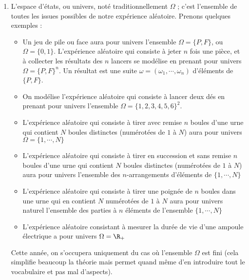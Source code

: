 \documentclass[12pt,a4paper]{report}
\begin{document}
\begin{enumerate}
	\item L'espace d'états, ou univers, noté traditionnellement $\Omega$ ; c'est l'ensemble de toutes les issues possibles de notre expérience aléatoire. Prenons quelques exemples : 
	\begin{itemize}
		\item Un jeu de pile ou face aura pour univers l'ensemble $\Omega = \{P,F\}$, ou $\Omega = \{0,1\}$. L'expérience aléatoire qui consiste à jeter $n$ fois une 
		pièce, et à collecter les résultats des $n$ lancers se modélise en prenant pour univers $\Omega = \{P,F\}^n$. Un résultat est une suite $\omega = (\omega_1,\cdots,\omega_n)$ d'éléments de $\{P,F\}$.
		\item On modélise l'expérience aléatoire qui consiste à lancer deux dés en prenant pour univers l'ensemble $\Omega = \{1,2,3,4,5,6\}^2$.
		\item L'expérience aléatoire qui consiste à tirer avec remise $n$ boules d'une urne qui contient $N$ boules distinctes (numérotées de $1$ à $N$) aura pour 
		univers $\Omega = \{1,\cdots,N\}$
		\item L'expérience aléatoire qui consiste à tirer en succession et sans remise $n$ boules d'une urne qui contient $N$ boules distinctes (numérotées de $1$ à 
		$N$) aura pour univers l'ensemble des $n$-arrangements d'éléments de $\{1,\cdots,N\}$
		\item L'expérience aléatoire qui consiste à tirer une poignée de $n$ boules dans une urne qui en contient $N$ numérotées de $1$ à $N$ aura pour univers 
		naturel l'ensemble des parties à $n$ éléments de l'ensemble $\{1,\cdots,N\}$ 
		\item L'expérience aléatoire consistant à mesurer la durée de vie d'une ampoule électrique a pour univers $\Omega = \R_+$
	\end{itemize}
	
	Cette année, on s'occupera uniquement du cas où l'ensemble $\Omega$ est fini (cela simplifie beaucoup la théorie mais permet quand même d'en introduire tout le vocabulaire et pas mal d'aspects).
	

\end{enumerate}
\end{document}
